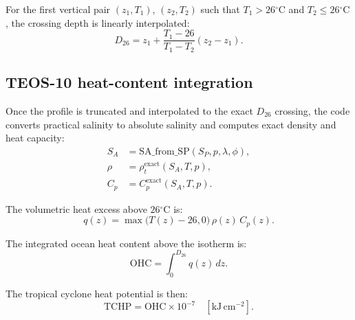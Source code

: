 \documentclass[11pt]{report}
\newcommand{\celsius}{\ensuremath{^{\circ}\mathrm{C}}}
\newcommand{\OHC}{\ensuremath{\mathrm{OHC}}}
\newcommand{\TCHP}{\ensuremath{\mathrm{TCHP}}}
\newcommand{\Dtwentysix}{\ensuremath{D_{26}}}
\begin{document}
For the first vertical pair \((z_1, T_1)\), \((z_2, T_2)\) such that \(T_1 > 26\celsius{}\) and \(T_2 \le 26\celsius{}\), the crossing depth is linearly interpolated:
\begin{equation}
\Dtwentysix{} = z_1 + \frac{T_1 - 26}{T_1 - T_2}(z_2 - z_1).
\end{equation}

\subsection{TEOS-10 heat-content integration}
Once the profile is truncated and interpolated to the exact \Dtwentysix{} crossing, the code converts practical salinity to absolute salinity and computes exact density and heat capacity:
\begin{align}
S_A &= \mathrm{SA\_from\_SP}(S_P, p, \lambda, \phi), \\
\rho &= \rho_t^{\mathrm{exact}}(S_A, T, p), \\
C_p &= C_p^{\mathrm{exact}}(S_A, T, p).
\end{align}

The volumetric heat excess above \(26\celsius{}\) is:
\begin{equation}
q(z) = \max\bigl(T(z) - 26, 0\bigr)\,\rho(z)\,C_p(z).
\end{equation}

The integrated ocean heat content above the isotherm is:
\begin{equation}
\OHC = \int_0^{\Dtwentysix{}} q(z)\,dz.
\end{equation}

The tropical cyclone heat potential is then:
\begin{equation}
\TCHP = \OHC \times 10^{-7} \quad [\mathrm{kJ\,cm^{-2}}].
\end{equation}
\end{document}
